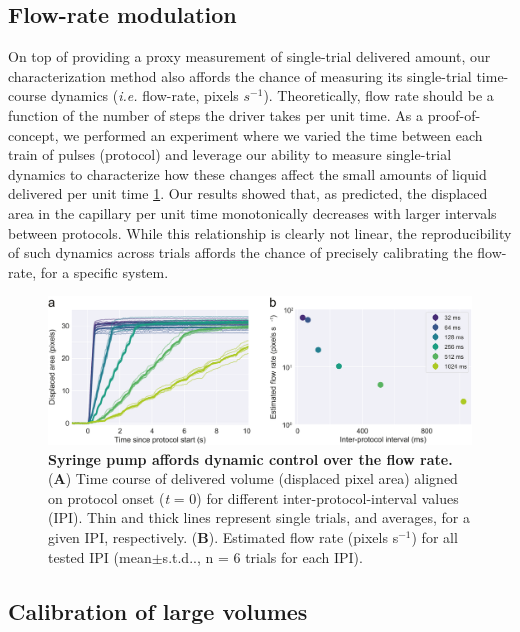 \subsection*{Flow-rate modulation}
On top of providing a proxy measurement of single-trial delivered amount, our characterization method also affords the chance of measuring its single-trial time-course dynamics (\textit{i.e.} flow-rate, pixels $s^{-1}$). Theoretically, flow rate should be a function of the number of steps the driver takes per unit time. As a proof-of-concept, we performed an experiment where we varied the time between each train of pulses (protocol) and leverage our ability to measure single-trial dynamics to characterize how these changes affect the small amounts of liquid delivered per unit time \ref{fig:FlowRateControl}. Our results showed that, as predicted, the displaced area in the capillary per unit time monotonically decreases with larger intervals between protocols. While this relationship is clearly not linear, the reproducibility of such dynamics across trials affords the chance of precisely calibrating the flow-rate, for a specific system.

\begin{figure}
	\centering
	\includegraphics[width=1.0\linewidth]{Figures/Artboard 3.pdf}
	\caption{\textbf{Syringe pump affords dynamic control over the flow rate.}\\
		(\textbf{A}) Time course of delivered volume (displaced pixel area) aligned on protocol onset (\textit{t} = 0) for different inter-protocol-interval values (IPI). Thin and thick lines represent single trials, and averages, for a given IPI, respectively. (\textbf{B}). Estimated flow rate (pixels s$^{-1}$) for all tested IPI (mean$\pm$s.t.d.., n = 6 trials for each IPI).}
	\label{fig:FlowRateControl} 
\end{figure}

\subsection*{Calibration of large volumes}


